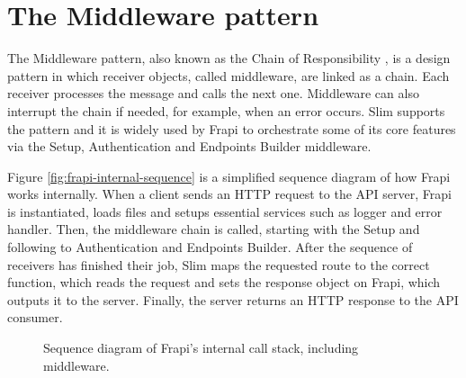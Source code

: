 \section{The Middleware pattern}

The Middleware pattern, also known as the Chain of Responsibility \cite{chain-of-responsibility}, is a design pattern in which receiver objects, called middleware, are linked as a chain. Each receiver processes the message and calls the next one. Middleware can also interrupt the chain if needed, for example, when an error occurs. Slim supports the pattern \cite{slim-middleware-doc} and it is widely used by Frapi to orchestrate some of its core features via the Setup, Authentication and Endpoints Builder middleware.

Figure \autoref{fig:frapi-internal-sequence} is a simplified sequence diagram of how Frapi works internally. When a client sends an HTTP request to the API server, Frapi is instantiated, loads files and setups essential services such as logger and error handler. Then, the middleware chain is called, starting with the Setup and following to Authentication and Endpoints Builder. After the sequence of receivers has finished their job, Slim maps the requested route to the correct function, which reads the request and sets the response object on Frapi, which outputs it to the server. Finally, the server returns an HTTP response to the API consumer.

\begin{figure}[htbp]
  \centering
  
  \caption{Sequence diagram of Frapi's internal call stack, including middleware.}
  \label{fig:frapi-internal-sequence}
\end{figure}